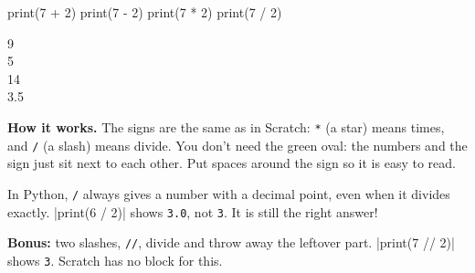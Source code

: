 \begin{tcbraster}[raster columns=2, raster equal height=rows, raster column skip=12pt, raster valign=center, raster force size=false, raster odd column/.style={add to width=-1.2cm}, raster even column/.style={add to width=1.2cm}]
\begin{tcolorbox}[colback=white, colframe=white, boxrule=0pt, valign=center]
\begin{scratch}
\end{scratch}
\end{tcolorbox}
\begin{tcolorbox}[colback=white, colframe=white, boxrule=0pt, left=0pt, right=0pt, top=0pt, bottom=0pt, valign=center]
\begin{code}
print(7 + 2)
print(7 - 2)
print(7 * 2)
print(7 / 2)
\end{code}
\begin{outputbox}
9\\
5\\
14\\
3.5
\end{outputbox}
\end{tcolorbox}
\end{tcbraster}

\textbf{How it works.} The signs are the same as in Scratch: \texttt{*} (a star) means times, and \texttt{/} (a slash) means divide. You don't need the green oval: the numbers and the sign just sit next to each other. Put spaces around the sign so it is easy to read.

\begin{watchout}
In Python, \texttt{/} always gives a number with a decimal point, even when it divides exactly. \py|print(6 / 2)| shows \texttt{3.0}, not \texttt{3}. It is still the right answer!

\textbf{Bonus:} two slashes, \texttt{//}, divide and throw away the leftover part. \py|print(7 // 2)| shows \texttt{3}. Scratch has no block for this.
\end{watchout}

